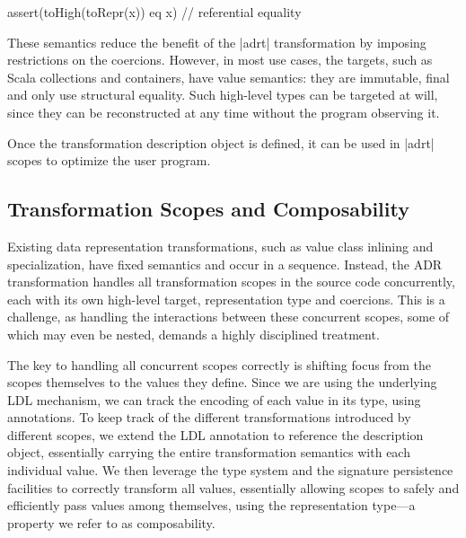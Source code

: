 \begin{lstlisting-nobreak}
assert(toHigh(toRepr(x)) eq x) // referential equality
\end{lstlisting-nobreak}

These semantics reduce the benefit of the |adrt| transformation by imposing restrictions on the coercions. However, in most use cases, the targets, such as Scala collections and containers, have value semantics: they are immutable, final and only use structural equality. Such high-level types can be targeted at will, since they can be reconstructed at any time without the program observing it.

Once the transformation description object is defined, it can be used in |adrt| scopes to optimize the user program.



\subsection{Transformation Scopes and Composability}
\label{sec:ildl:scoped}

Existing data representation transformations, such as value class inlining and specialization, have fixed semantics and occur in a sequence. Instead, the ADR transformation handles all transformation scopes in the source code concurrently, each with its own high-level target, representation type and coercions. This is a challenge, as handling the interactions between these concurrent scopes, some of which may even be nested, demands a highly disciplined treatment.


The key to handling all concurrent scopes correctly is shifting focus from the scopes themselves to the values they define. Since we are using the underlying LDL mechanism, we can track the encoding of each value in its type, using annotations. To keep track of the different transformations introduced by different scopes, we extend the LDL annotation to reference the description object, essentially carrying the entire transformation semantics with each individual value. We then leverage the type system and the signature persistence facilities to correctly transform all values, essentially allowing scopes to safely and efficiently pass values among themselves, using the representation type---a property we refer to as composability.

